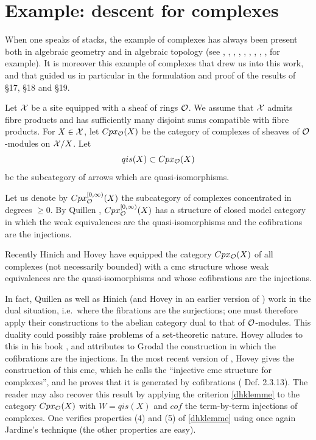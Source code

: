 
\clearpage
\section{Example: descent for complexes}
\label{complexepage}

When one speaks of stacks, the example of complexes has always been present
both in algebraic geometry and in algebraic topology
(see \cite{SGA4b}, \cite{SGA6}, \cite{GabrielZisman}, \cite{Quillen}, \cite{ResiduesDuality},
\cite{Illusie}, \cite{ThomasonTrobaugh},
\cite{BondalKapranov}, \cite{Hinich2}, \cite{HoveyBook} for example).
It is moreover this example of complexes that drew us into this work, and
that guided us in particular in the formulation and proof of the results
of \S17, \S18 and \S19.


Let ${\cal X}$ be a site equipped with a sheaf of rings ${\cal O}$.
We assume that ${\cal X}$ admits fibre products and has sufficiently many disjoint
sums compatible with fibre products. For $X\in {\cal X}$, let
$Cpx_{{\cal O}}(X)$ be the category of complexes of sheaves of
${\cal O}$-modules on ${\cal X} /X$. Let
$$
qis(X)\subset Cpx_{{\cal O}}(X)
$$
be the subcategory of arrows which are quasi-isomorphisms.

Let us denote by $Cpx_{{\cal O}}^{[0, \infty )}(X)$ the subcategory of complexes
concentrated in degrees
$\geq 0$. By
Quillen \cite{Quillen}, $Cpx_{{\cal O}}^{[0,
\infty )}(X)$ has a structure of closed model category in which the
weak equivalences are the quasi-isomorphisms and the cofibrations
are the injections.

Recently Hinich \cite{Hinich2} and Hovey \cite{HoveyBook} have equipped
the category $Cpx_{{\cal O}}(X)$ of all complexes (not necessarily
bounded) with a cmc structure whose
weak equivalences are the quasi-isomorphisms and whose cofibrations
are the injections.

In fact, Quillen as well as Hinich (and Hovey in an earlier version
of \cite{HoveyBook})
work in the dual situation, i.e.\ where the fibrations are the
surjections; one must therefore
apply their constructions
to the abelian category dual to that of ${\cal O}$-modules. This
duality could
possibly
raise problems of a set-theoretic nature. Hovey alludes to this in
his book
\cite{HoveyBook}, and attributes to Grodal
the construction in which the cofibrations are
the injections.
In the most recent version of \cite{HoveyBook}, Hovey gives the
construction of this cmc, which he
calls the ``injective cmc structure for complexes'', and he proves
that it is generated
by cofibrations
(\cite{HoveyBook} Def. 2.3.13). The reader may also recover this result by applying the criterion
\ref{dhklemme}
to the category $Cpx_{{\cal O}}(X)$ with $W = qis(X)$ and $cof$ the term-by-term
injections of complexes. One verifies properties (4) and (5) of
\ref{dhklemme}
using once again Jardine's technique \cite{Jardine} (the other
properties are
easy).


